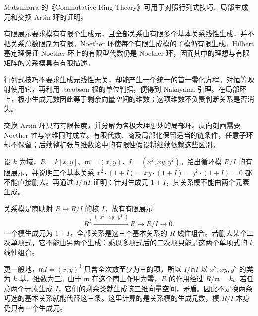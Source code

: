 \ProseParagraphBreak
Matsumura 的《Commutative Ring Theory》\cite[Theorems 2.1--2.3, pp. 7--9; Theorem 3.2, p. 16]{Matsumura1989CommutativeRingTheory}可用于对照行列式技巧、局部生成元和交换 Artin 环的证明。






\begin{chaptersummary}
	有限展示要求模有有限个生成元，且全部关系由有限多个基本关系线性生成，并不把关系总数限制为有限。Noether 环使每个有限生成模的子模仍有限生成。Hilbert 基定理保证 Noether 环上的有限型代数仍是 Noether 环，因而其中的理想与有限矩阵的关系模具有有限描述。

	\ProseParagraphBreak
	行列式技巧不要求生成元线性无关，却能产生一个统一的首一零化方程。对恒等映射使用它，再利用 Jacobson 根的单位判据，便得到 Nakayama 引理。在局部环上，极小生成元数因此等于剩余向量空间的维数；这项维数不负责判断关系是否消失。

	\ProseParagraphBreak
	交换 Artin 环具有有限长度，并分解为各极大理想处的局部环。反向刻画需要 Noether 性与零维同时成立。有限代数、商及局部化保留适当的链条件，任意子环却不保留；后续整扩张与维数论中的有限性假设将继续依赖这些区别。
\end{chaptersummary}

\BookExercises

\begin{exercise}\label{b3:ex:03-cyclic-presentation}
	设 \(k\) 为域，\(R=k[x,y]\)、\(\mathfrak m=(x,y)\)、\(I=(x^2,xy,y^2)\)。给出循环模 \(R/I\) 的有限展示，并说明三个基本关系 \(x^2\cdot(1+I)=xy\cdot(1+I)=y^2\cdot(1+I)=0\) 都不能直接删去。再通过 \(I/\mathfrak mI\) 证明：针对生成元 \(1+I\)，其关系模不能由两个元素生成。
\end{exercise}
\begin{solution}
	关系模是商映射 \(R\to R/I\) 的核 \(I\)，故有有限展示
	\[
		R^3\xrightarrow{\begin{pmatrix}x^2&xy&y^2\end{pmatrix}}R
		\longrightarrow R/I\longrightarrow0.
	\]
	一个模生成元为 \(1+I\)，全部关系是这三个基本关系的 \(R\) 线性组合。若删去某个二次单项式，它不能由另两个生成：乘以多项式后的二次项只能是这两个单项式的 \(k\) 线性组合。

	更一般地，\(\mathfrak mI=(x,y)^3\) 只含全次数至少为三的项，所以 \(I/\mathfrak mI\) 以 \(x^2,xy,y^2\) 的类为 \(k\) 基，维数为三。由于 \(\mathfrak m\) 在这个商上作用为零，\(R\) 的作用经过 \(R/\mathfrak m=k\)。若任意两个元素生成 \(I\)，它们的剩余类就生成该三维向量空间，矛盾。因此不是换两条巧选的基本关系就能代替这三条。这里计算的是关系模的生成元数，模 \(R/I\) 本身仍只有一个生成元。
\end{solution}

